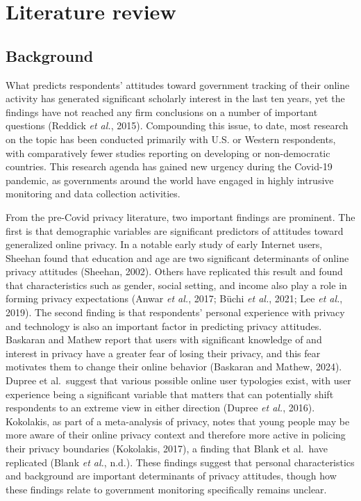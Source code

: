 \documentclass[
  letterpaper,
  DIV=11,
  numbers=noendperiod]{scrartcl}
\begin{document}
\section{Literature review}\label{sec-litreview}

\subsection{Background}\label{background}

What predicts respondents' attitudes toward government tracking of their
online activity has generated significant scholarly interest in the last
ten years, yet the findings have not reached any firm conclusions on a
number of important questions (Reddick \emph{et al.}, 2015). Compounding
this issue, to date, most research on the topic has been conducted
primarily with U.S. or Western respondents, with comparatively fewer
studies reporting on developing or non-democratic countries. This
research agenda has gained new urgency during the Covid-19 pandemic, as
governments around the world have engaged in highly intrusive monitoring
and data collection activities.

From the pre-Covid privacy literature, two important findings are
prominent. The first is that demographic variables are significant
predictors of attitudes toward generalized online privacy. In a notable
early study of early Internet users, Sheehan found that education and
age are two significant determinants of online privacy attitudes
(Sheehan, 2002). Others have replicated this result and found that
characteristics such as gender, social setting, and income also play a
role in forming privacy expectations (Anwar \emph{et al.}, 2017; Büchi
\emph{et al.}, 2021; Lee \emph{et al.}, 2019). The second finding is
that respondents' personal experience with privacy and technology is
also an important factor in predicting privacy attitudes. Baskaran and
Mathew report that users with significant knowledge of and interest in
privacy have a greater fear of losing their privacy, and this fear
motivates them to change their online behavior (Baskaran and Mathew,
2024). Dupree et al.~suggest that various possible online user
typologies exist, with user experience being a significant variable that
matters that can potentially shift respondents to an extreme view in
either direction (Dupree \emph{et al.}, 2016). Kokolakis, as part of a
meta-analysis of privacy, notes that young people may be more aware of
their online privacy context and therefore more active in policing their
privacy boundaries (Kokolakis, 2017), a finding that Blank et al.~have
replicated (Blank \emph{et al.}, n.d.). These findings suggest that
personal characteristics and background are important determinants of
privacy attitudes, though how these findings relate to government
monitoring specifically remains unclear.
\end{document}

